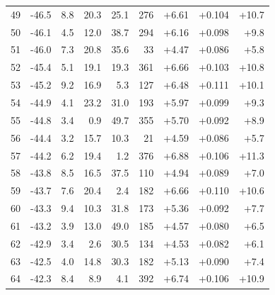 \begin{longtable}{@{}r r r r r r r r r@{}}
49 & -46.5 & 8.8 & 20.3 & 25.1 & 276 & \cellcolor{green!67}+6.61 & \cellcolor{yellow!65}+0.104 & \cellcolor{orange!66}+10.7 \\
50 & -46.1 & 4.5 & 12.0 & 38.7 & 294 & \cellcolor{green!64}+6.16 & \cellcolor{yellow!62}+0.098 & \cellcolor{orange!62}+9.8 \\
51 & -46.0 & 7.3 & 20.8 & 35.6 & 33 & \cellcolor{green!51}+4.47 & \cellcolor{yellow!56}+0.086 & \cellcolor{orange!43}+5.8 \\
52 & -45.4 & 5.1 & 19.1 & 19.3 & 361 & \cellcolor{green!68}+6.66 & \cellcolor{yellow!65}+0.103 & \cellcolor{orange!67}+10.8 \\
53 & -45.2 & 9.2 & 16.9 & 5.3 & 127 & \cellcolor{green!66}+6.48 & \cellcolor{yellow!69}+0.111 & \cellcolor{orange!63}+10.1 \\
54 & -44.9 & 4.1 & 23.2 & 31.0 & 193 & \cellcolor{green!62}+5.97 & \cellcolor{yellow!63}+0.099 & \cellcolor{orange!60}+9.3 \\
55 & -44.8 & 3.4 & 0.9 & 49.7 & 355 & \cellcolor{green!60}+5.70 & \cellcolor{yellow!59}+0.092 & \cellcolor{orange!58}+8.9 \\
56 & -44.4 & 3.2 & 15.7 & 10.3 & 21 & \cellcolor{green!51}+4.59 & \cellcolor{yellow!56}+0.086 & \cellcolor{orange!43}+5.7 \\
57 & -44.2 & 6.2 & 19.4 & 1.2 & 376 & \cellcolor{green!69}+6.88 & \cellcolor{yellow!66}+0.106 & \cellcolor{orange!69}+11.3 \\
58 & -43.8 & 8.5 & 16.5 & 37.5 & 110 & \cellcolor{green!54}+4.94 & \cellcolor{yellow!58}+0.089 & \cellcolor{orange!49}+7.0 \\
59 & -43.7 & 7.6 & 20.4 & 2.4 & 182 & \cellcolor{green!68}+6.66 & \cellcolor{yellow!68}+0.110 & \cellcolor{orange!66}+10.6 \\
60 & -43.3 & 9.4 & 10.3 & 31.8 & 173 & \cellcolor{green!57}+5.36 & \cellcolor{yellow!59}+0.092 & \cellcolor{orange!52}+7.7 \\
61 & -43.2 & 3.9 & 13.0 & 49.0 & 185 & \cellcolor{green!51}+4.57 & \cellcolor{yellow!53}+0.080 & \cellcolor{orange!46}+6.5 \\
62 & -42.9 & 3.4 & 2.6 & 30.5 & 134 & \cellcolor{green!51}+4.53 & \cellcolor{yellow!54}+0.082 & \cellcolor{orange!44}+6.1 \\
63 & -42.5 & 4.0 & 14.8 & 30.3 & 182 & \cellcolor{green!56}+5.13 & \cellcolor{yellow!58}+0.090 & \cellcolor{orange!51}+7.4 \\
64 & -42.3 & 8.4 & 8.9 & 4.1 & 392 & \cellcolor{green!68}+6.74 & \cellcolor{yellow!66}+0.106 & \cellcolor{orange!67}+10.9 \\

\end{longtable}
